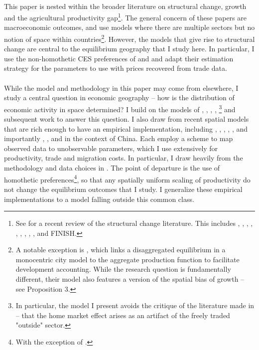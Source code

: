 \documentclass[]{article}
\begin{document}
\paragraph*{}
This paper is nested within the broader literature on structural change, growth and the agricultural productivity gap\footnote{See \citet{hrvch6} for a recent review of the structural change literature. This includes \citet{ngaipissa}, \citet{boppart2014}, \citet{cominetal2021}, \citet{matsuyama1992, matsuyama2009, engelslawglobal}, \citet{uy2013}, \citet{bustos1996etal}, \citet{bustos2020etal}, \citet{swiecki2017}, \citet{loganetal}, \citet{cravinosotelo}  and \citet{duarterestuccia} FINISH.}. The general concern of these papers are macroeconomic outcomes, and use models where there are multiple sectors but no notion of space within countries\footnote{A notable exception is \citet{karadi2017cattle}, which links a disaggregated equilibrium in a monocentric city model to the aggregate production function to facilitate development accounting. While the research question is fundamentally different, their model also features a version of the spatial bias of growth -- see Proposition 3.}. However, the models that give rise to structural change are central to the equilibrium geography that I study here. In particular, I use the non-homothetic CES preferences of \citet{cominetal2021} and \citet{loganetal} and adapt their estimation strategy for the parameters to use with prices recovered from trade data. 
\paragraph*{}
While the model and methodology in this paper may come from elsewhere, I study a central question in economic geography -- how is the distribution of economic activity in space determined? I build on the models of \citet{krugman1991}, \citet{PUGA1999}, \citet{aggtraderev}, \citet{MURATA2008}, \citet{donalddavishme}\footnote{In particular, the model I present avoids the critique of the literature made in \citet{donalddavishme} -- that the home market effect arises as an artifact of the freely traded "outside" sector.} and subsequent work to answer this question. I also draw from recent spatial models that are rich enough to have an empirical implementation, including \citet{allenarkolakis}, \citet{redding2016}, \citet{nagyhinterlands}, \citet{pathdep}, \citet{geodev}, \citet{sotello2020} and importantly \citet{tombezhu}, \citet{hao2020}, \citet{MA2020} and \cite{Fan2019} in the context of China. Each employ a scheme to map observed data to unobservable parameters, which I use extensively for productivity, trade and migration costs. In particular, I draw heavily from the methodology and data choices in \citet{tombezhu}. The point of departure is the use of homothetic preferences\footnote{With the exception of \cite{hao2020}.}, so that any spatially uniform scaling of productivity do not change the equilibrium outcomes that I study. I generalize these empirical implementations to a model falling outside this common class.  
\end{document}
